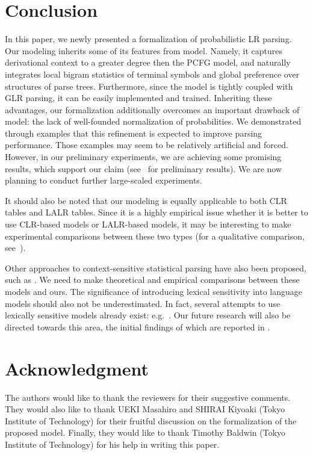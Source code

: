 \documentclass[a4j]{article}
\def\BC{}
\begin{document}
\section{Conclusion}

In this paper, we newly presented a formalization of probabilistic LR
parsing. Our modeling inherits some of its features from \BC
model. Namely, it captures derivational context to a greater degree then
the PCFG model, and naturally integrates local bigram statistics of
terminal symbols and global preference over structures of parse
trees. Furthermore, since the model is tightly coupled with GLR parsing,
it can be easily implemented and trained. Inheriting these advantages,
our formalization additionally overcomes an important drawback of \BC
model: the lack of well-founded normalization of probabilities. We
demonstrated through examples that this refinement is expected to
improve parsing performance. Those examples may seem to be relatively
artificial and forced. However, in our preliminary experiments, we are
achieving some promising results, which support our claim
(see~\cite{virach:97:b,virach:97:c} for preliminary results). We are now
planning to conduct further large-scaled experiments.

It should also be noted that our modeling is equally applicable to both
CLR tables and LALR tables. Since it is a highly
empirical issue whether it is better to use CLR-based models or
LALR-based models, it may be interesting to make experimental
comparisons between these two types (for a qualitative comparison,
see~\cite{inui:97:a}).

Other approaches to context-sensitive statistical parsing have also been
proposed, such as \cite{magerman:91:b,black:93:a,kita:94:a,sekine:95:a}. 
We need to make theoretical and empirical comparisons between these
models and ours. The significance of introducing lexical sensitivity
into language models should also not be underestimated. In fact, several
attempts to use lexically sensitive models already exist:
e.g.~\cite{schabes:92:a,collins:96:a,li:96:a,charniak:97:a}. Our future
research will also be directed towards this area, the initial findings
of which are reported in \cite{inui:97:f,inui:97:b,shirai:97:a}.

\section*{Acknowledgment}

The authors would like to thank the reviewers for their suggestive
comments. They would also like to thank UEKI Masahiro and SHIRAI Kiyoaki
(Tokyo Institute of Technology) for their fruitful discussion on the
formalization of the proposed model. Finally, they would like to thank
Timothy Baldwin (Tokyo Institute of Technology) for his help in writing
this paper.
\end{document}
